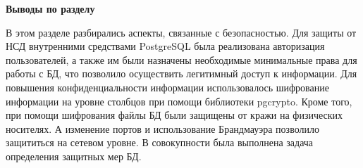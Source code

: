 \bigbreak
\textbf{Выводы по разделу}
\bigbreak

В этом разделе разбирались аспекты, связанные с безопасностью. Для защиты от НСД внутренними средствами PostgreSQL была реализована авторизация пользователей, а также им были назначены необходимые минимальные права для работы с БД, что позволило осуществить легитимный доступ к информации. Для повышения конфиденциальности информации использовалось шифрование информации на уровне столбцов при помощи библиотеки pgcrypto. Кроме того, при помощи шифрования файлы БД были защищены от кражи на физических носителях. А изменение портов и использование Брандмауэра позволило защититься на сетевом уровне. В совокупности была выполнена задача определения защитных мер БД.